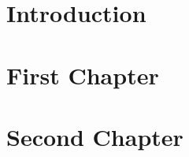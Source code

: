 \documentclass{report}
\begin{document}
\chapter{Introduction}
\lipsum[2-4]

\chapter{First Chapter}


\chapter{Second Chapter}


\printbibliography
\end{document}
